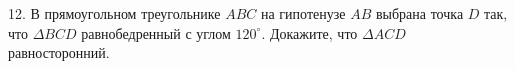 12. В прямоугольном треугольнике $ABC$ на гипотенузе $AB$ выбрана точка $D$ так, что
$\Delta BCD$ равнобедренный с углом $120^\circ.$ Докажите, что $\Delta ACD$ равносторонний.\\
